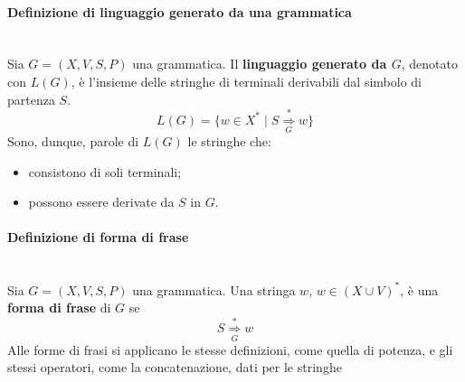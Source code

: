 \documentclass[12pt]{report}
\begin{document}
	\paragraph{Definizione di linguaggio generato da una grammatica} \quad \\
	Sia $G=(X, V, S, P)$ una grammatica. Il \textbf{linguaggio generato da $G$}, denotato con $L(G)$, è l'insieme delle stringhe di terminali derivabili dal simbolo di partenza $S$.
	\[
	L(G) = \{w \in X^* \mid S \underset{G}{\overset{*}{\Rightarrow}} w\}
	\]
	Sono, dunque, parole di $L(G)$ le stringhe che:
	\begin{itemize}
		\item consistono di soli terminali;
		\item possono essere derivate da $S$ in $G$.
	\end{itemize}
	\paragraph{Definizione di forma di frase} \quad \\
	Sia $G = (X, V, S, P)$ una grammatica. Una stringa $w$, $w \in (X \cup V)^*$, è una \textbf{forma di frase} di $G$ se
	\[
	S \underset{G}{\overset{*}{\Rightarrow}} w
	\]
	Alle forme di frasi si applicano le stesse definizioni, come quella di potenza, e gli stessi operatori, come la concatenazione, dati per le stringhe
\end{document}
